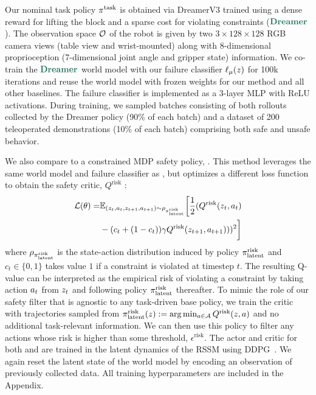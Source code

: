 Our nominal task policy $\pi^{\text{task}}$ is obtained via DreamerV3 \cite{hafner2024masteringdiversedomainsworld} trained using a dense reward for lifting the block and a sparse cost for violating constraints ($\dreamer$). 
The observation space $\mathcal{O}$ of the robot is given by two $3 \times 128 \times 128$ RGB camera views (table view and wrist-mounted) along with 8-dimensional proprioception (7-dimensional joint angle and gripper state) information. 
We co-train the $\dreamer$ world model with our failure classifier $\ell_\mu(z)$ for 100k iterations and reuse the world model with frozen weights for our method and all other baselines. The failure classifier is implemented as a 3-layer MLP with ReLU activations. During training, we sampled batches consisting of both rollouts collected by the Dreamer policy (90$\%$ of each batch) and a dataset of 200 teleoperated demonstrations (10$\%$ of each batch) comprising both safe and unsafe behavior. 

We also compare \ours to a constrained MDP safety policy, \cmdp \cite{srinivasan2020learning, thananjeyan2021recovery}. 
This method leverages the same world model and failure classifier as \ours, but optimizes a different loss function to obtain the safety critic, $Q^\textrm{risk}$ \cite{srinivasan2020learning}:
\begin{equation}
\begin{aligned}
    \mathcal{L}(\theta) = &\mathbb{E}_{(z_t, a_t, z_{t+1}, a_{t+1
    }) \sim \rho_{\pi^{\textrm{risk}}_{\textrm{latent}}}} \bigg[ \frac{1}{2}(Q^\textrm{risk}(z_t, a_t) \\&- (c_t + (1-c_t))\gamma Q^\textrm{risk}(z_{t+1},a_{t+1})))^2\bigg]
\end{aligned}
\end{equation}
where $\rho_{\pi^{\textrm{risk}}_{\textrm{latent}}}$ is the state-action distribution induced by policy $\pi^{\textrm{risk}}_{\textrm{latent}}$ and $c_t \in \{0, 1\}$ takes value $1$ if a constraint is violated at timestep $t$. 
The resulting Q-value can be interpreted as the empirical risk of violating a constraint by taking action $a_t$ from $z_t$ and following policy $\pi^{\textrm{risk}}_{\textrm{latent}}$ thereafter. 
To mimic the role of our safety filter that is agnostic to any task-driven base policy, we train the \cmdp critic with trajectories sampled from $\pi^{\textrm{risk}}_{\textrm{latent}}(z) := \arg\min_{a \in \mathcal{A}} Q^\textrm{risk}(z, a)$ and no additional task-relevant information. 
We can then use this policy to filter any actions whose risk is higher than some threshold, $\epsilon^\textrm{risk}$. The actor and critic for both \cmdp and \ours are trained in the latent dynamics of the RSSM using DDPG~\cite{lillicrap2019continuouscontroldeepreinforcement, li2025certifiabledeeplearningreachability}. 
We again reset the latent state of the world model by encoding an observation of previously collected data. All training hyperparameters are included in the Appendix. 

